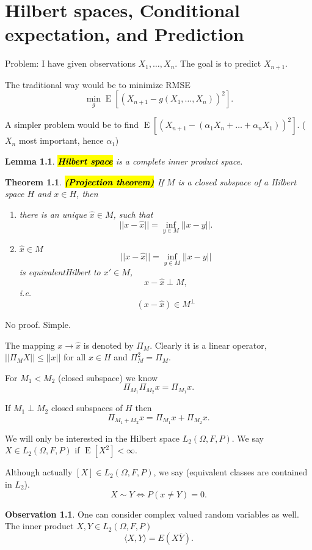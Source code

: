 \documentclass[12pt,a4paper, notitlepage]{book}
\newcommand{\hlc}[2][yellow]{ {\sethlcolor{#1} \hl{#2}} }
\newcommand{\hlcr}[1]{\hlc[lightred]{#1}}
\theoremstyle{definition} %
\newtheorem*{observation}{Observation}
\theoremstyle{plain} %
\newtheorem{definition}{Lemma}[chapter]
\newtheorem{theorem}{Theorem}
\DeclareMathOperator{\E}{E}
\newcommand{\New}[1]{ {\bf \hlcr{#1} } }
\begin{document}
\newpage
\chapter{Hilbert spaces, Conditional expectation, and Prediction}

\vskip1cm

Problem: I have given observations $X_1, \dots, X_n$. The goal is to predict $X_{n+1}$. 

The traditional way would be to minimize RMSE 
\[ \min_g \E[ (X_{n+1} - g(X_1, \dots, X_n))^2 ] . \]

A simpler problem would be to find $ \E[(X_{n+1} - (\alpha_1 X_n + \dots + \alpha_n X_1))^2 ] $. ($X_n$ most important, hence $\alpha_1$)

\begin{definition}
\New{ Hilbert space} is a complete inner product space.
\end{definition}

\begin{theorem} \New{ (Projection theorem) }
If $M$ is a closed subspace of a Hilbert space $H$ and $x \in H$, then
\begin{enumerate}
\item there is an unique $\hat{x} \in M$, such that
\[ || x - \hat{x}|| = \inf_{y \in M}|| x - y || . \]
\item $\hat{x} \in M $ 
\[ || x - \hat{x}|| = \inf_{y \in M}|| x - y || \] is equivalentHilbert to $x' \in M$, 
\[ x - \hat{x} \perp M , \] i.e.
\[ (x - \hat{x}) \in M^{\perp} \]
\end{enumerate}
\end{theorem}
\proof
No proof. Simple.
\endproof


The mapping $x \rightarrow \hat{x}$ is denoted by $\Pi_M$. Clearly it is a linear operator, $|| \Pi_M X|| \leq ||x||$ for all $x \in H$ and $\Pi_M^2 = \Pi_M$. 

For $M_1 < M_2$ (closed subspace) we know 
\[\Pi_{M_1}\Pi_{M_2}x = \Pi_{M_1}x. \]

If $M_1 \perp M_2$ closed subspaces of $H$ then 
 \[ \Pi_{M_1 + M_2} x = \Pi_{M_1}x + \Pi_{M_2}x. \]

We will only be interested in the Hilbert space $L_2(\Omega, F, P)$. We say $X \in L_2(\Omega, F, P)$ if $\E[X^2] < \infty$.

Although actually $[X] \in L_2(\Omega, F, P)$, we say 
 (equivalent classes are contained in $L_2$). 
\[ X \sim Y \iff P(x \neq Y) = 0. \]
\begin{observation}
One can consider complex valued random variables as well. The inner product $X, Y \in L_2(\Omega, F, P)$
\[  \langle X,Y \rangle = E(X \overline{Y}). \]
\end{observation}
\end{document}

